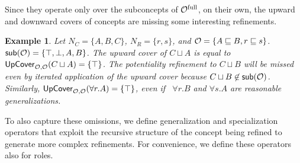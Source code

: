 \documentclass[
]{ceurart}
\newtheorem{example}{Example}
\begin{document}
Since they operate only over the subconcepts of ${\mathcal{O}^\textnormal{full}}$, on their own, the upward and downward covers of concepts are missing some interesting refinements.

\begin{example} \label{exa:up-cover}
  Let $N_C = \{A, B, C\}$, $N_R = \{ r, s \}$, and $\mathcal{O} = \{A \sqsubseteq B, r \sqsubseteq s\}$. $\mathop{\mathsf{sub}}(\mathcal{O}) = \{\top, \bot, A, B\}$. The upward cover of $C \sqcup A$ is equal to ${\mathsf{UpCover}}_{\mathcal{O},\mathcal{O}}(C \sqcup A) = \{ \top \}$. The potentiality refinement to $C \sqcup B$ will be missed even by iterated application of the upward cover because $C \sqcup B \not\in \mathop{\mathsf{sub}}(\mathcal{O})$. Similarly, ${\mathsf{UpCover}}_{\mathcal{O},\mathcal{O}}(\forall r.A) = \{ \top \}$, even if \  $\forall r.B$ and $\forall s.A$ are reasonable generalizations.
\end{example}

To also capture these omissions, we define generalization and specialization operators that exploit the recursive structure of the concept being refined to generate more complex refinements. For convenience, we define these operators also for roles.
\end{document}
